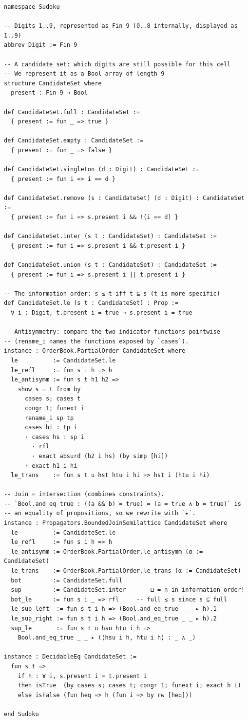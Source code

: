 \documentclass[12pt, a4paper, openright]{book}
\theoremstyle{thmstyle}
\theoremstyle{defstyle}
\begin{document}
\begin{verbatim}
namespace Sudoku

-- Digits 1..9, represented as Fin 9 (0..8 internally, displayed as 1..9)
abbrev Digit := Fin 9

-- A candidate set: which digits are still possible for this cell
-- We represent it as a Bool array of length 9
structure CandidateSet where
  present : Fin 9 → Bool

def CandidateSet.full : CandidateSet :=
  { present := fun _ => true }

def CandidateSet.empty : CandidateSet :=
  { present := fun _ => false }

def CandidateSet.singleton (d : Digit) : CandidateSet :=
  { present := fun i => i == d }

def CandidateSet.remove (s : CandidateSet) (d : Digit) : CandidateSet :=
  { present := fun i => s.present i && !(i == d) }

def CandidateSet.inter (s t : CandidateSet) : CandidateSet :=
  { present := fun i => s.present i && t.present i }

def CandidateSet.union (s t : CandidateSet) : CandidateSet :=
  { present := fun i => s.present i || t.present i }

-- The information order: s ≤ t iff t ⊆ s (t is more specific)
def CandidateSet.le (s t : CandidateSet) : Prop :=
  ∀ i : Digit, t.present i = true → s.present i = true

-- Antisymmetry: compare the two indicator functions pointwise
-- (rename_i names the functions exposed by `cases`).
instance : OrderBook.PartialOrder CandidateSet where
  le          := CandidateSet.le
  le_refl     := fun s i h => h
  le_antisymm := fun s t h1 h2 =>
    show s = t from by
      cases s; cases t
      congr 1; funext i
      rename_i sp tp
      cases hi : tp i
      · cases hs : sp i
        · rfl
        · exact absurd (h2 i hs) (by simp [hi])
      · exact h1 i hi
  le_trans    := fun s t u hst htu i hi => hst i (htu i hi)

-- Join = intersection (combines constraints).
-- `Bool.and_eq_true : ((a && b) = true) = (a = true ∧ b = true)` is
-- an equality of propositions, so we rewrite with `▸`.
instance : Propagators.BoundedJoinSemilattice CandidateSet where
  le          := CandidateSet.le
  le_refl     := fun s i h => h
  le_antisymm := OrderBook.PartialOrder.le_antisymm (α := CandidateSet)
  le_trans    := OrderBook.PartialOrder.le_trans (α := CandidateSet)
  bot         := CandidateSet.full
  sup         := CandidateSet.inter    -- ⊔ = ∩ in information order!
  bot_le      := fun s i _ => rfl     -- full ≤ s since s ⊆ full
  le_sup_left  := fun s t i h => (Bool.and_eq_true _ _ ▸ h).1
  le_sup_right := fun s t i h => (Bool.and_eq_true _ _ ▸ h).2
  sup_le       := fun s t u hsu htu i h =>
    Bool.and_eq_true _ _ ▸ (⟨hsu i h, htu i h⟩ : _ ∧ _)

instance : DecidableEq CandidateSet :=
  fun s t =>
    if h : ∀ i, s.present i = t.present i
    then isTrue  (by cases s; cases t; congr 1; funext i; exact h i)
    else isFalse (fun heq => h (fun i => by rw [heq]))

end Sudoku
\end{verbatim}
\end{document}

